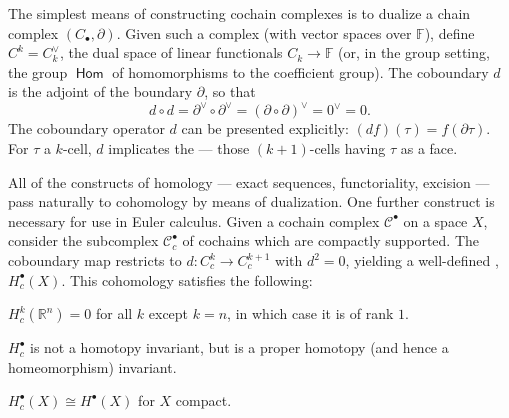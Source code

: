 \documentclass{psapm-l}
\theoremstyle{definition}
\theoremstyle{remark}
\numberwithin{equation}{section}
\begin{document}
The simplest means of constructing cochain complexes is to dualize a chain complex $(C_{\bullet},{\partial})$. Given such a complex (with vector spaces over ${{\mathbb F}}$), define $C^k=C_k^\vee$, the dual space of linear functionals $C_k\to{{\mathbb F}}$ (or, in the group setting, the group ${{{\operatorname{\mathsf{{Hom}}}}}}$ of homomorphisms to the coefficient group). The coboundary $d$ is the adjoint of the boundary ${\partial}$, so that
\[
    d\circ d={\partial}^\vee\circ{\partial}^\vee=({\partial}\circ{\partial})^\vee=0^\vee=0.
\]
The coboundary operator $d$ can be presented explicitly: $(df)(\tau) = f({\partial}\tau)$. For $\tau$ a $k$-cell, $d$ implicates the {{}} --- those $(k+1)$-cells having $\tau$ as a face.

All of the constructs of homology --- exact sequences, functoriality, excision --- pass naturally to cohomology by means of dualization. One further construct is necessary for use in Euler calculus. Given a cochain complex ${{\mathcal C}}^{\bullet}$ on a space $X$, consider the subcomplex ${{\mathcal C}}^{\bullet}_c$ of cochains which are compactly supported. The coboundary map restricts to $d:C_c^k\to C^{k+1}_c$ with $d^2=0$, yielding a well-defined {{}}, $H^{\bullet}_c(X)$. This cohomology satisfies the following:
\begin{enumerate*}
\item   $H^k_c({{\mathbb R}}^n)=0$ for all $k$ except $k=n$, in which case it is of rank $1$.
\item   $H^{\bullet}_c$ is not a homotopy invariant, but is a proper homotopy (and hence a homeomorphism) invariant.
\item   $H^{\bullet}_c(X){\cong} H^{\bullet}(X)$ for $X$ compact.
\end{enumerate*}
\end{document}
